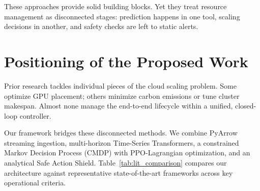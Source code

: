\documentclass[12pt]{report}
\begin{document}
These approaches provide solid building blocks. Yet they treat resource management as disconnected stages: prediction happens in one tool, scaling decisions in another, and safety checks are left to static alerts. 

\section{Positioning of the Proposed Work}

Prior research tackles individual pieces of the cloud scaling problem. Some optimize GPU placement; others minimize carbon emissions or tune cluster makespan. Almost none manage the end-to-end lifecycle within a unified, closed-loop controller.

Our framework bridges these disconnected methods. We combine PyArrow streaming ingestion, multi-horizon Time-Series Transformers, a constrained Markov Decision Process (CMDP) with PPO-Lagrangian optimization, and an analytical Safe Action Shield. Table~\ref{tab:lit_comparison} compares our architecture against representative state-of-the-art frameworks across key operational criteria.

\begin{table}[htbp]
\centering
\caption{Systematic Comparison with Existing Cloud Scheduling Literature}
\label{tab:lit_comparison}
\end{table}
\end{document}
